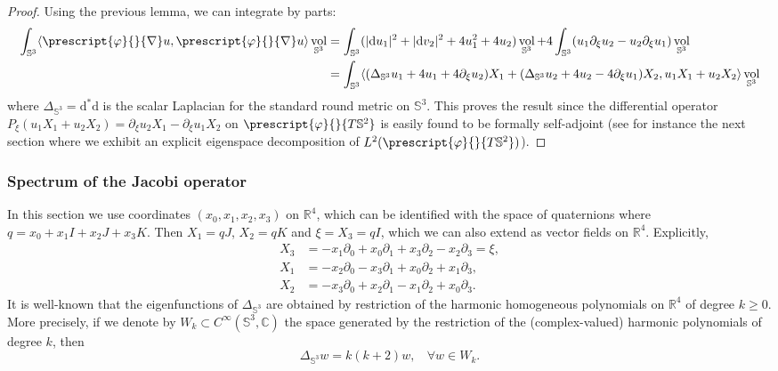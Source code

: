 \documentclass{article}
\numberwithin{equation}{section}        %
\theoremstyle{bfnote}
\theoremstyle{definition}
\theoremstyle{bfremark}
\newcommand{\R}{\mathbb{R}}                 %
\newcommand{\C}{\mathbb{C}}                 %
\newcommand{\Sp}{\mathbb{S}}                %
\newcommand{\diff}{\mathrm{d}}                      %
\DeclareMathOperator{\vol}{vol}                 %
\begin{document}
\begin{proof}
    Using the previous lemma, we can integrate by parts:
    \begin{align*}
        \int_{\Sp^3} \langle \prescript{\varphi}{}{\nabla} u, \prescript{\varphi}{}{\nabla} u \rangle \vol_{\Sp^3}  & = \int_{\Sp^3}  (|\diff u_1|^2 + |\diff v_2|^2 + 4 u_1^2 + 4u_2) \vol_{\Sp^3} + 4 \int_{\Sp^3} (u_1 \partial_\xi u_2 - u_2 \partial_\xi u_1) \vol_{\Sp^3}  \\
            & = \int_{\Sp^3} \langle (\Delta_{\mathbb{S}^3} u_1 + 4 u_1 + 4 \partial_\xi u_2) X_1 + (\Delta_{\mathbb{S}^3} u_2 + 4u_2 - 4 \partial_\xi u_1) X_2, u_1 X_1 + u_2 X_2 \rangle \vol_{\Sp^3}
    \end{align*}
    where $\Delta_{\mathbb{S}^3} = \diff^* \diff$ is the scalar Laplacian for the standard round metric on $\Sp^3$. This proves the result since the differential operator $P_\xi(u_1 X_1 + u_2X_2) = \partial_\xi u_2 X_1 - \partial_\xi u_1 X_2$ on $\prescript{\varphi}{}{T\Sp^2}$ is easily found to be formally self-adjoint (see for instance the next section where we exhibit an explicit eigenspace decomposition of $L^2(\prescript{\varphi}{}{T\Sp^2})$).
\end{proof}


    \subsubsection{Spectrum of the Jacobi operator}     \label{subsubsec: Jacobi-Spectrum for Hopf fibration}

In this section we use coordinates $(x_0,x_1,x_2,x_3)$ on $\R^4$, which can be identified with the space of quaternions where $q = x_0 + x_1 I + x_2 J + x_3 K$. Then $X_1 = qJ$, $X_2 = qK$ and $\xi = X_3 = qI$, which we can also extend as vector fields on $\R^4$. Explicitly,
\begin{align*}
    X_3 & = - x_1 \partial_0 + x_0 \partial_1 + x_3 \partial_2 - x_2 \partial_3 = \xi, \\
    X_1 & = - x_2 \partial_0 - x_3 \partial_1 + x_0 \partial_2 + x_1 \partial_3 , \\
    X_2 & = - x_3 \partial_0 + x_2 \partial_1 - x_1 \partial_2 + x_0 \partial_3 .
\end{align*}
It is well-known that the eigenfunctions of $\Delta_{\Sp^3}$ are obtained by restriction of the harmonic homogeneous polynomials on $\R^4$ of degree $k \geq 0$. More precisely, if we denote by $W_k \subset C^\infty(\Sp^3,\C)$ the space generated by the restriction of the (complex-valued) harmonic polynomials of degree $k$, then
\begin{equation*}
    \Delta_{\Sp^3} w = k(k+2) w, ~~~~ \forall w \in W_k.
\end{equation*}
\end{document}
